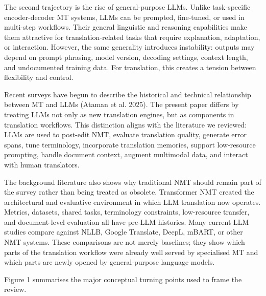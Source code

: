 \documentclass[11pt]{article}
\begin{document}
The second trajectory is the rise of general-purpose LLMs. Unlike task-specific encoder-decoder MT systems, LLMs can be prompted, fine-tuned, or used in multi-step workflows. Their general linguistic and reasoning capabilities make them attractive for translation-related tasks that require explanation, adaptation, or interaction. However, the same generality introduces instability: outputs may depend on prompt phrasing, model version, decoding settings, context length, and undocumented training data. For translation, this creates a tension between flexibility and control.

Recent surveys have begun to describe the historical and technical relationship between MT and LLMs (Ataman et al. 2025). The present paper differs by treating LLMs not only as new translation engines, but as components in translation workflows. This distinction aligns with the literature we reviewed: LLMs are used to post-edit NMT, evaluate translation quality, generate error spans, tune terminology, incorporate translation memories, support low-resource prompting, handle document context, augment multimodal data, and interact with human translators.

The background literature also shows why traditional NMT should remain part of the survey rather than being treated as obsolete. Transformer NMT created the architectural and evaluative environment in which LLM translation now operates. Metrics, datasets, shared tasks, terminology constraints, low-resource transfer, and document-level evaluation all have pre-LLM histories. Many current LLM studies compare against NLLB, Google Translate, DeepL, mBART, or other NMT systems. These comparisons are not merely baselines; they show which parts of the translation workflow were already well served by specialised MT and which parts are newly opened by general-purpose language models.

Figure 1 summarises the major conceptual turning points used to frame the review.
\end{document}
